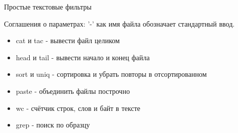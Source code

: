 \begin{frame}{Простые текстовые фильтры}

  Соглашения о параметрах: \alert{'-'} как имя файла обозначает стандартный ввод.
  

  \begin{itemize}
    \item \alert{cat} и \alert{tac} - вывести файл целиком
    \item \alert{head} и \alert{tail} - вывести начало и конец файла 
    \item \alert{sort} и \alert{uniq} - сортировка и убрать повторы в отсортированном
    \item \alert{paste} - объединить файлы построчно
    \item \alert{wc} - счётчик строк, слов и байт в тексте
    \item \alert{grep} - поиск по образцу

  \end{itemize}
\end{frame}
